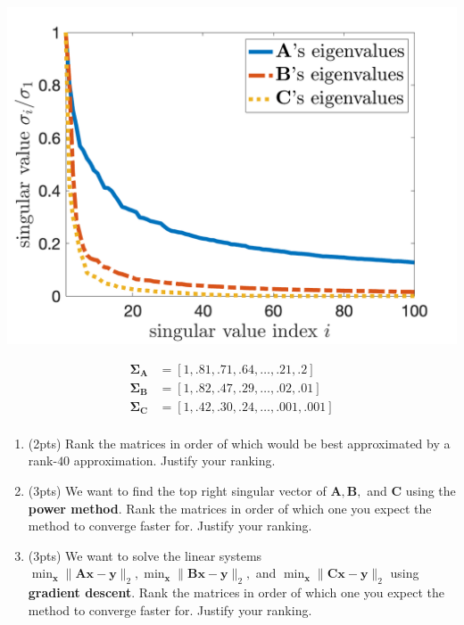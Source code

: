 \documentclass[10pt]{article}
\newcommand{\bs}[1]{\boldsymbol{#1}}
\newcommand{\bv}[1]{\mathbf{#1}}
\begin{document}
		\noindent\begin{minipage}[c]{0.49\textwidth}
			\includegraphics[width=.9\textwidth]{spectranew.png}
		\end{minipage}%
		\begin{minipage}[c]{0.49\textwidth}
			\Large
			\begin{align*}
				\bs{\Sigma}_{\bv{A}}&= [1,.81, .71, .64, \ldots, .21, .2]\\
				\bs{\Sigma}_{\bv{B}}&= [1,.82, .47, .29,  \ldots,.02,.01]\\
				\bs{\Sigma}_{\bv{C}} &= [1,.42, .30, .24, \ldots, .001, .001]\\
			\end{align*}
		\end{minipage}
		\vspace{2em}
\begin{enumerate}[label=(\alph*)]
		\item (2pts) Rank the matrices in order of which  would be best approximated by a rank-$40$ approximation. Justify your ranking.
	\vspace{11em}
	
		\item (3pts)  We want to find the top right singular vector of $\bv{A}, \bv{B},$ and $\bv{C}$ using the \textbf{power method}. Rank the matrices in order of which one you expect the method to converge faster for. Justify your ranking.
			\vspace{11em}
		
		\item (3pts)  We want to  solve the linear systems $\min_{\bv{x}} \|\bv{A}\bv{x} - \bv{y}\|_2, \min_{\bv{x}} \|\bv{B}\bv{x} - \bv{y}\|_2,$ and $\min_{\bv{x}} \|\bv{C}\bv{x} - \bv{y}\|_2$ using \textbf{gradient descent}.  Rank the matrices in order of which one you expect the method to converge faster for. Justify your ranking.
	\vspace{11em}		

		
\end{enumerate}
\end{document}
